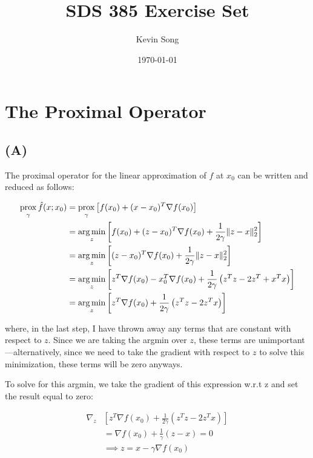 \documentclass{article}
\title{SDS 385 Exercise Set}
\author{Kevin Song}
\date{\today}
\DeclarePairedDelimiter\norm{\lVert}{\rVert}
\DeclareMathOperator*{\argmin}{arg\,min}
\newcommand{\prox}{ \mathop{\mathrm{prox}} }
\begin{document}
\maketitle

\section*{The Proximal Operator}

\subsection*{(A)}

The proximal operator for the linear approximation of $f$ at $x_0$ can be
written and reduced as follows:

\begin{align*}
  \prox\limits_\gamma \hat{f}(x ; x_0)
  &= \prox\limits_\gamma \left[ f(x_0) + (x - x_0)^T\nabla f(x_0) \right]\\
  &= \argmin\limits_z \left[ f(x_0) + (z - x_0)^T \nabla f(x_0) +
    \frac{1}{2\gamma} \norm{z - x}_2^2 \right]\\
  &= \argmin\limits_z \left[ (z - x_0)^T \nabla f(x_0) +
    \frac{1}{2\gamma} \norm{z - x}_2^2 \right]\\
  &= \argmin\limits_z \left[ z^T \nabla f(x_0) - x_0^T \nabla f(x_0) +
    \frac{1}{2\gamma} \left( z^Tz - 2 z^T + x^Tx \right) \right]\\
  &= \argmin\limits_z \left[ z^T \nabla f(x_0) +
    \frac{1}{2\gamma} \left( z^Tz - 2 z^Tx \right) \right]\\
\end{align*}

where, in the last step, I have thrown away any terms
that are constant with respect to $z$. Since we are taking the argmin over $z$,
these terms are unimportant---alternatively, since we need to take the gradient
with respect to $z$ to solve this minimization, these terms will be zero
anyways.

To solve for this argmin, we take the gradient of this expression w.r.t z and
set the result equal to zero:

\begin{align*}
  \nabla_z& \left[ z^T \nabla f(x_0) +
            \frac{1}{2\gamma} \left( z^Tz - 2 z^Tx \right) \right]\\
          &= \nabla f(x_0) + \frac{1}{\gamma}(z - x) = 0\\
          &\implies z = x - \gamma \nabla f(x_0)
\end{align*}
\end{document}

